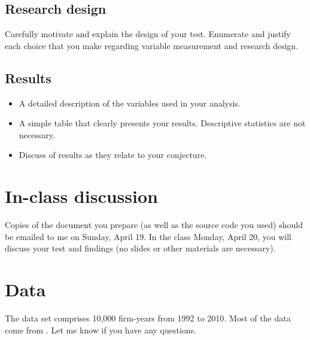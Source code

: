 \documentclass[11pt]{amsart}
\begin{document}
\subsection{Research design}
Carefully motivate and explain the design of your test. 
Enumerate and justify each choice that you make regarding  variable measurement and research design. 

\subsection{Results}
\begin{itemize}
    \item A detailed description of the variables used in your analysis. 
    \item A simple table that clearly presents your results. Descriptive statistics are not necessary.
    \item Discuss of results as they relate to your conjecture.
\end{itemize}

\section{In-class discussion}
Copies of the document you prepare (as well as the source code you used) should be emailed to me on Sunday, April 19.
In the class  Monday, April 20, you will discuss your test and findings (no slides or other materials are necessary).     

\section{Data}
The data set comprises 10,000 firm-years from 1992 to 2010. 
Most of the data come from \citet{Armstrong:2013hs}. 
Let me know if you have any questions.
\end{document}

